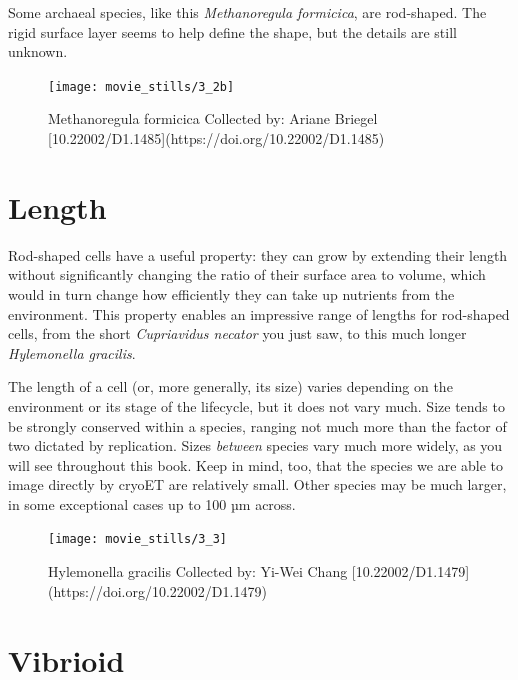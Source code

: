 \documentclass[]{tufte-book}
\begin{document}
Some archaeal species, like this \emph{Methanoregula formicica}, are
rod-shaped. The rigid surface layer seems to help define the shape, but
the details are still unknown.

\begin{figure}
\texttt{[image: movie\_stills/3\_2b]} \caption[Methanoregula formicica Collected by]{Methanoregula formicica Collected by: Ariane Briegel [10.22002/D1.1485](https://doi.org/10.22002/D1.1485)}\label{fig:unnamed-chunk-48}
\end{figure}

\section{Length}\label{length}

Rod-shaped cells have a useful property: they can grow by extending
their length without significantly changing the ratio of their surface
area to volume, which would in turn change how efficiently they can take
up nutrients from the environment. This property enables an impressive
range of lengths for rod-shaped cells, from the short \emph{Cupriavidus
necator} you just saw, to this much longer \emph{Hylemonella gracilis}.

The length of a cell (or, more generally, its size) varies depending on
the environment or its stage of the lifecycle, but it does not vary
much. Size tends to be strongly conserved within a species, ranging not
much more than the factor of two dictated by replication. Sizes
\emph{between} species vary much more widely, as you will see throughout
this book. Keep in mind, too, that the species we are able to image
directly by cryoET are relatively small. Other species may be much
larger, in some exceptional cases up to 100 µm across.

\begin{figure}
\texttt{[image: movie\_stills/3\_3]} \caption[Hylemonella gracilis Collected by]{Hylemonella gracilis Collected by: Yi-Wei Chang [10.22002/D1.1479](https://doi.org/10.22002/D1.1479)}\label{fig:unnamed-chunk-49}
\end{figure}

\section{Vibrioid}\label{vibrioid}
\end{document}
